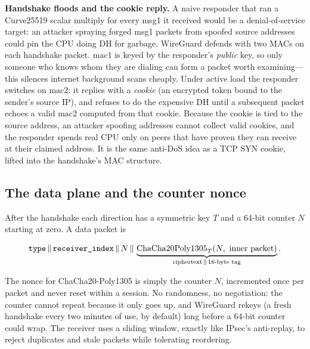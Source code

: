 \begin{walkbox}
\end{walkbox}

\begin{attackbox}
\textbf{Handshake floods and the cookie reply.} A naive responder that ran a Curve25519 scalar multiply for every msg1 it received would be a denial-of-service target: an attacker spraying forged msg1 packets from spoofed source addresses could pin the CPU doing DH for garbage. WireGuard defends with two MACs on each handshake packet. \(\mathrm{mac1}\) is keyed by the responder's \emph{public} key, so only someone who knows whom they are dialing can form a packet worth examining---this silences internet background scans cheaply. Under active load the responder switches on \(\mathrm{mac2}\): it replies with a \emph{cookie} (an encrypted token bound to the sender's source IP), and refuses to do the expensive DH until a subsequent packet echoes a valid \(\mathrm{mac2}\) computed from that cookie. Because the cookie is tied to the source address, an attacker spoofing addresses cannot collect valid cookies, and the responder spends real CPU only on peers that have proven they can receive at their claimed address. It is the same anti-DoS idea as a TCP SYN cookie, lifted into the handshake's MAC structure.
\end{attackbox}

\subsection{The data plane and the counter nonce}

After the handshake each direction has a symmetric key \(T\) and a 64-bit counter \(N\) starting at zero. A data packet is

\[
\texttt{type}\,\|\, \texttt{receiver\_index}\,\|\, N \,\|\, \underbrace{\text{ChaCha20Poly1305}_{T}(N,\ \text{inner packet})}_{\text{ciphertext} \,\|\, \text{16-byte tag}}.
\]

The nonce for ChaCha20-Poly1305 is simply the counter \(N\), incremented once per packet and never reset within a session. No randomness, no negotiation: the counter cannot repeat because it only goes up, and WireGuard rekeys (a fresh handshake every two minutes of use, by default) long before a 64-bit counter could wrap. The receiver uses a sliding window, exactly like IPsec's anti-replay, to reject duplicates and stale packets while tolerating reordering.

